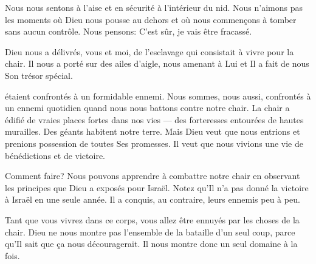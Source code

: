 Nous nous sentons à l'aise et en sécurité à l'intérieur du nid.
 Nous n'aimons pas les moments où Dieu nous pousse au dehors
 et où nous commençons à tomber sans aucun contrôle.
 Nous pensons: \og C'est sûr, je vais être fracassé. \fg{}


Dieu nous a délivrés, vous et moi, de l'esclavage
 qui consistait à vivre pour la chair.
 Il nous a porté sur des ailes d'aigle, nous amenant à Lui
 et Il a fait de nous Son trésor spécial. 

\dvrule







 étaient confrontés à un formidable ennemi.
 Nous sommes, nous aussi, confrontés à un ennemi quotidien
 quand nous nous battons contre notre chair.
 La chair a édifié de vraies places fortes dans nos vies
 --- des forteresses entourées de hautes murailles.
 Des géants habitent notre terre.
 Mais Dieu veut que nous entrions et prenions possession
 de toutes Ses promesses.
 Il veut que nous vivions une vie de bénédictions et de victoire.

Comment faire? Nous pouvons apprendre à combattre notre chair
 en observant les principes que Dieu a exposés pour Israël.
 Notez qu'Il n'a pas donné la victoire à Israël en une seule année.
 Il a conquis, au contraire, leurs ennemis peu à peu.


Tant que vous vivrez dans ce corps,
 vous allez être ennuyés par les choses de la chair.
 Dieu ne nous montre pas l'ensemble de la bataille d'un seul coup,
 parce qu'Il sait que ça nous découragerait.
 Il nous montre donc un seul domaine à la fois.

